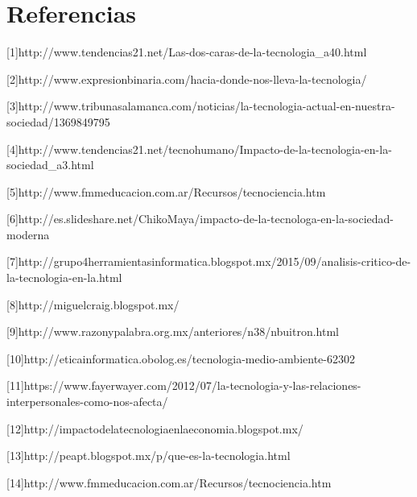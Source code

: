 \documentclass{bmcart}
\begin{document}
\section*{Referencias}
[1]http://www.tendencias21.net/Las-dos-caras-de-la-tecnologia\_a40.html\smallskip

[2]http://www.expresionbinaria.com/hacia-donde-nos-lleva-la-tecnologia/\smallskip

[3]http://www.tribunasalamanca.com/noticias/la-tecnologia-actual-en-nuestra-sociedad/1369849795\smallskip

[4]http://www.tendencias21.net/tecnohumano/Impacto-de-la-tecnologia-en-la-sociedad\_a3.html\smallskip

[5]http://www.fmmeducacion.com.ar/Recursos/tecnociencia.htm\smallskip

[6]http://es.slideshare.net/ChikoMaya/impacto-de-la-tecnologa-en-la-sociedad-moderna\smallskip

[7]http://grupo4herramientasinformatica.blogspot.mx/2015/09/analisis-critico-de-la-tecnologia-en-la.html\smallskip

[8]http://miguelcraig.blogspot.mx/\smallskip

[9]http://www.razonypalabra.org.mx/anteriores/n38/nbuitron.html\smallskip

[10]http://eticainformatica.obolog.es/tecnologia-medio-ambiente-62302\smallskip

[11]https://www.fayerwayer.com/2012/07/la-tecnologia-y-las-relaciones-interpersonales-como-nos-afecta/\smallskip

[12]http://impactodelatecnologiaenlaeconomia.blogspot.mx/\smallskip

[13]http://peapt.blogspot.mx/p/que-es-la-tecnologia.html\smallskip

[14]http://www.fmmeducacion.com.ar/Recursos/tecnociencia.htm\smallskip



\end{document}
